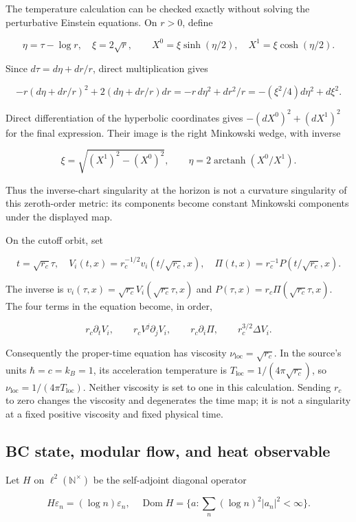 The temperature calculation can be checked exactly without solving the perturbative Einstein equations. On \(r>0\), define

\[
\eta=\tau-\log r,\quad \xi=2\sqrt r,
\qquad X^0=\xi\sinh(\eta/2),\quad X^1=\xi\cosh(\eta/2).
\]

Since \(d \tau=d \eta+dr/r\), direct multiplication gives

\[
-r(d\eta+dr/r)^2+2(d\eta+dr/r)dr
=-r\,d\eta^2+dr^2/r
=-(\xi^2/4)d\eta^2+d\xi^2.
\]

Direct differentiation of the hyperbolic coordinates gives \(-(dX^0)^2+(dX^1)^2\) for the final expression. Their image is the right Minkowski wedge, with inverse

\[
\xi=\sqrt{(X^1)^2-(X^0)^2},\qquad
\eta=2\operatorname{arctanh}(X^0/X^1).
\]

Thus the inverse-chart singularity at the horizon is not a curvature singularity of this zeroth-order metric: its components become constant Minkowski components under the displayed map.

On the cutoff orbit, set

\[
t=\sqrt{r_c}\tau,\quad
V_i(t,x)=r_c^{-1/2}v_i(t/\sqrt{r_c},x),\quad
\Pi(t,x)=r_c^{-1}P(t/\sqrt{r_c},x).
\]

The inverse is \(v_i(\tau,x)=\sqrt{r_c}V_i(\sqrt{r_c}\tau,x)\) and \(P(\tau,x)=r_c \Pi(\sqrt{r_c}\tau,x)\). The four terms in the equation become, in order,

\[
r_c\partial_tV_i,\qquad r_cV^j\partial_jV_i,
\qquad r_c\partial_i\Pi,\qquad r_c^{3/2}\Delta V_i.
\]

Consequently the proper-time equation has viscosity \(\nu_{\mathrm{loc}}=\sqrt{r_c}\). In the source's units \(\hbar=c=k_B=1\), its acceleration temperature is \(T_{\mathrm{loc}}=1/(4\pi\sqrt{r_c})\), so \(\nu_{\mathrm{loc}}=1/(4\pi T_{\mathrm{loc}})\). Neither viscosity is set to one in this calculation. Sending \(r_c\) to zero changes the viscosity and degenerates the time map; it is not a singularity at a fixed positive viscosity and fixed physical time.

\subsection{BC state, modular flow, and heat observable}\label{bc-state-modular-flow-and-heat-observable}

Let \(H\) on \(\ell^2(\mathbb N^\times)\) be the self-adjoint diagonal operator

\[
H\varepsilon_n=(\log n)\varepsilon_n,\quad
\operatorname{Dom}H=\{a:\sum_n(\log n)^2|a_n|^2<\infty\}.
\]

